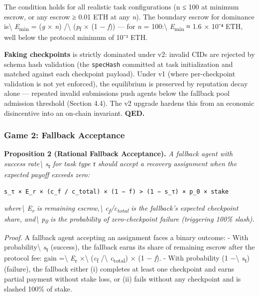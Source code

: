 \documentclass[
  10pt,
]{article}
\begin{document}
The condition holds for all realistic task configurations (n ≤ 100 at
minimum escrow, or any escrow ≥ 0.01 ETH at any \emph{n}). The boundary
escrow for dominance is\textbackslash{} \emph{E}\textsubscript{min} =
(\emph{g} × \emph{n}) /\textbackslash{} (\emph{p}\textsubscript{f} × (1
− \emph{f})) --- for \emph{n} = 100:\textbackslash{}
\emph{E}\textsubscript{min} ≈ 1.6 × 10⁻⁴ ETH, well below the protocol
minimum of 10⁻³ ETH.

\textbf{Faking checkpoints} is strictly dominated under v2: invalid CIDs
are rejected by schema hash validation (the \texttt{specHash} committed
at task initialization and matched against each checkpoint payload).
Under v1 (where per-checkpoint validation is not yet enforced), the
equilibrium is preserved by reputation decay alone --- repeated invalid
submissions push agents below the fallback pool admission threshold
(Section 4.4). The v2 upgrade hardens this from an economic disincentive
into an on-chain invariant. \textbf{QED.}

\hypertarget{game-2-fallback-acceptance}{%
\subsubsection{Game 2: Fallback
Acceptance}\label{game-2-fallback-acceptance}}

\textbf{Proposition 2 (Rational Fallback Acceptance).} \emph{A fallback
agent with success rate\textbackslash{} s\textsubscript{τ} for task type
τ should accept a recovery assignment when the expected payoff exceeds
zero:}

\begin{verbatim}
s_τ × E_r × (c_f / c_total) × (1 − f) > (1 − s_τ) × p_0 × stake
\end{verbatim}

\emph{where\textbackslash{} E\textsubscript{r} is remaining
escrow,\textbackslash{} c\textsubscript{f}/c\textsubscript{total} is the
fallback's expected checkpoint share, and\textbackslash{}
p\textsubscript{0} is the probability of zero-checkpoint failure
(triggering 100\% slash).}

\emph{Proof.} A fallback agent accepting an assignment faces a binary
outcome: - With probability\textbackslash{} \emph{s}\textsubscript{τ}
(success), the fallback earns its share of remaining escrow after the
protocol fee: gain =\textbackslash{} \emph{E}\textsubscript{r}
×\textbackslash{} (\emph{c}\textsubscript{f} /\textbackslash{}
\emph{c}\textsubscript{total}) × (1 − \emph{f}). - With probability (1
−\textbackslash{} \emph{s}\textsubscript{τ}) (failure), the fallback
either (i) completes at least one checkpoint and earns partial payment
without stake loss, or (ii) fails without any checkpoint and is slashed
100\% of stake.
\end{document}
